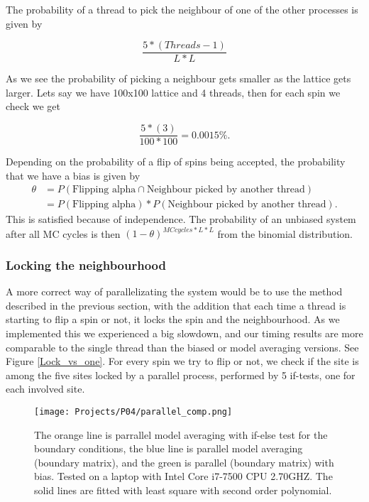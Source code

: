 \documentclass[a4paper]{article}
\begin{document}
The probability of a thread to pick the neighbour of one of the other processes is given by

\begin{equation}
\frac{5*(Threads-1)}{L*L}
\end{equation}

As we see the probability of picking a neighbour gets smaller as the lattice gets larger. Lets say we have 100x100 lattice and 4 threads, then for each spin we check we get


\begin{equation}
\frac{5*(3)}{100*100} = 0.0015 \% .
\end{equation}

Depending on the probability of a flip of spins being accepted, the probability that we have a bias is given by
\begin{align}
    \theta &= P(\text{Flipping alpha} \cap \text{Neighbour picked by another thread}) \nonumber \\
    &= P(\text{Flipping alpha}) * P(\text{Neighbour picked by another thread}).
\end{align}
This is satisfied because of independence. The probability of an unbiased system after all MC cycles is then $(1 - \theta)^{MC cycles * L*L}$ from the binomial distribution.


\subsubsection*{Locking the neighbourhood}

A more correct way of parallelizating the system would be to use the method described in the previous section, with the addition that each time a thread is starting to flip a spin or not, it locks the spin and the neighbourhood. As we implemented this we experienced a big slowdown, and our timing results are more comparable to the single thread than the biased or model averaging versions. See Figure \ref{Lock_vs_one}. For every spin we try to flip or not, we check if the site is among the five sites locked by a parallel process, performed by 5 if-tests, one for each involved site.

\begin{figure}[H]
  \centering
  \texttt{[image: Projects/P04/parallel\_comp.png]}
  \caption{The orange line is parrallel model averaging with if-else test for the boundary conditions, the blue line is parallel model averaging (boundary matrix), and the green is parallel (boundary matrix) with bias. Tested on a laptop with Intel Core i7-7500 CPU 2.70GHZ. The solid lines are fitted with least square with second order polynomial.}
  \label{parallel_comp}
\end{figure}
\end{document}
